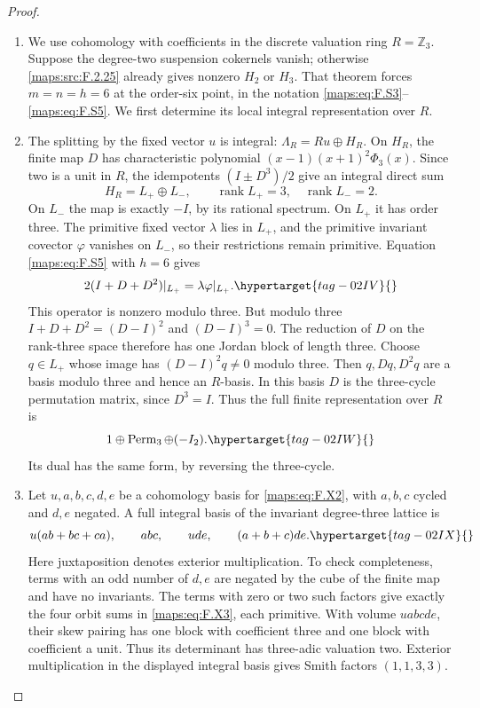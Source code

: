 \documentclass[11pt,a4paper]{article}
\numberwithin{equation}{section}
\theoremstyle{definition}
\begin{document}
\begin{proof}
\begin{enumerate}[label=\arabic*.]
\item We use cohomology with coefficients in the discrete valuation
ring $R=\mathbb Z_3$.  Suppose the degree-two suspension
cokernels vanish; otherwise \ref{maps:src:F.2.25} already gives nonzero
$H_2$ or $H_3$.  That theorem forces $m=n=h=6$ at the
order-six point, in the notation \eqref{maps:eq:F.S3}--\eqref{maps:eq:F.S5}.
We first determine its local integral representation over $R$.

\item The splitting by the fixed vector $u$ is integral:
$\Lambda_R=Ru\oplus H_R$.  On $H_R$, the finite map $D$
has characteristic polynomial
$(x-1)(x+1)^2\Phi_3(x)$.  Since two is a unit in $R$,
the idempotents $(I\pm D^3)/2$ give an integral direct sum
\[
 H_R=L_+\oplus L_-,\qquad
 \operatorname{rank}L_+=3,\quad
 \operatorname{rank}L_-=2.
\]
On $L_-$ the map is exactly $-I$, by its rational spectrum.
On $L_+$ it has order three.  The primitive fixed vector
$\lambda$ lies in $L_+$, and the primitive invariant
covector $\varphi$ vanishes on $L_-$, so their restrictions
remain primitive.  Equation \eqref{maps:eq:F.S5} with $h=6$ gives
\begin{equation}
 2(I+D+D^2)|_{L_+}=\lambda\varphi|_{L_+}.
 \hypertarget{tag-02IV}{}\label{maps:eq:F.X1}
\end{equation}
This operator is nonzero modulo three.  But modulo three
$I+D+D^2=(D-I)^2$ and $(D-I)^3=0$.  The reduction of $D$
on the rank-three space therefore has one Jordan block
of length three.  Choose $q\in L_+$ whose image has
$(D-I)^2q\ne0$ modulo three.  Then $q,Dq,D^2q$ are a
basis modulo three and hence an $R$-basis.  In this basis
$D$ is the three-cycle permutation matrix, since $D^3=I$.
Thus the full finite representation over $R$ is
\begin{equation}
                   1\oplus\operatorname{Perm}_3\oplus(-I_2).
 \hypertarget{tag-02IW}{}\label{maps:eq:F.X2}
\end{equation}
Its dual has the same form, by reversing the three-cycle.

\item Let $u,a,b,c,d,e$ be a cohomology basis for \eqref{maps:eq:F.X2}, with
$a,b,c$ cycled and $d,e$ negated.  A full integral basis
of the invariant degree-three lattice is
\begin{equation}
 u(ab+bc+ca),\qquad abc,\qquad ude,\qquad(a+b+c)de.
 \hypertarget{tag-02IX}{}\label{maps:eq:F.X3}
\end{equation}
Here juxtaposition denotes exterior multiplication.
To check completeness, terms with an odd number of
$d,e$ are negated by the cube of the finite map and
have no invariants.  The terms with zero or two such
factors give exactly the four orbit sums in \eqref{maps:eq:F.X3},
each primitive.  With volume $uabcde$, their skew
pairing has one block with coefficient three and one
block with coefficient a unit.  Thus its determinant
has three-adic valuation two. Exterior multiplication in the displayed
integral basis gives Smith factors $(1,1,3,3)$.


\end{enumerate}
\end{proof}
\end{document}
